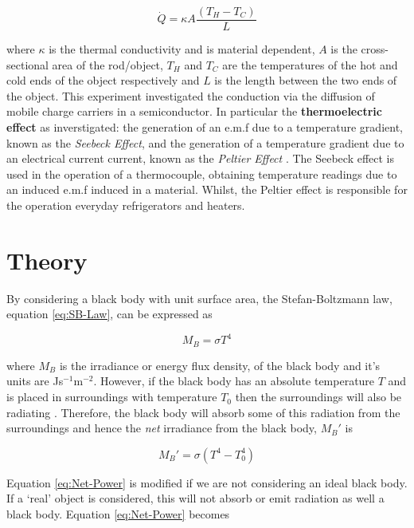 \documentclass{article}
\begin{document}
\begin{equation}
\label{eq:Conduction}
\dot{Q} = \kappa A \frac{(T_H - T_C)}{L}
\end{equation}

\vspace{2mm}
\noindent
where $\kappa$ is the thermal conductivity and is material dependent, $A$ is the cross-sectional area of the rod/object, $T_H$ and $T_C$ are the temperatures of the hot and cold ends of the object respectively and $L$ is the length between the two ends of the object. This experiment investigated the conduction via the diffusion of mobile charge carriers \cite{Paper02} in a semiconductor. In particular the \textbf{thermoelectric effect} as inverstigated: the generation of an e.m.f due to a temperature gradient, known as the \textit{Seebeck Effect}, and the generation of a temperature gradient due to an electrical current current, known as the \textit{Peltier Effect} \cite{Paper02}. The Seebeck effect is used in the operation of a thermocouple, obtaining temperature readings due to an induced e.m.f induced in a material. Whilst, the Peltier effect is responsible for the operation everyday refrigerators and heaters. 


\section{Theory}
\label{sec:theory}

By considering a black body with unit surface area, the Stefan-Boltzmann law, equation \eqref{eq:SB-Law}, can be expressed as

\begin{equation}
\label{eq:SB-Law1}
M_B = \sigma T^4
\end{equation}

\vspace{2mm}
\noindent
where $M_B$ is the irradiance or energy flux density, of the black body \cite{Paper01} and it's units are Js$^{-1}$m$^{-2}$. However, if the black body has an absolute temperature $T$ and is placed in surroundings with temperature $T_0$ then the surroundings will also be radiating \cite{Book01}. Therefore, the black body will absorb some of this radiation from the surroundings and hence the \textit{net} irradiance from the black body, $M_B '$ is

\begin{equation}
\label{eq:Net-Power}
M_B ' = \sigma (T^4 - T_0^4)
\end{equation}

\vspace{2mm}
\noindent
Equation \eqref{eq:Net-Power} is modified if we are not considering an ideal black body. If a `real' object is considered, this will not absorb or emit radiation as well a black body. Equation \eqref{eq:Net-Power} becomes
\end{document}
